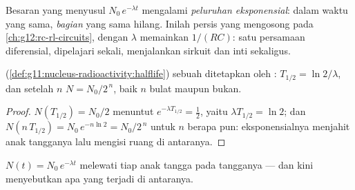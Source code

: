 \begin{definition}\label{def:g12:radioactive-decay:exponential}
Besaran yang menyusul $N_0\,e^{-\lambda t}$ mengalami \emph{peluruhan
eksponensial}: dalam waktu yang sama, \emph{bagian} yang
sama hilang. Inilah persis  yang mengosong pada
\cref{ch:g12:rc-rl-circuits}, dengan $\lambda$ memainkan $1/(RC)$: satu
persamaan diferensial, dipelajari sekali, menjalankan sirkuit dan inti sekaligus.
\end{definition}

\begin{proposition}\label{prop:g12:radioactive-decay:halflife}
 (\cref{def:g11:nucleus-radioactivity:halflife}) sebuah 
ditetapkan oleh : $T_{1/2} = \ln 2/\lambda$, dan setelah $n$
 $N = N_0/2^{\,n}$, baik $n$ bulat maupun bukan.
\end{proposition}

\begin{proof}
$N(T_{1/2}) = N_0/2$ menuntut $e^{-\lambda T_{1/2}} = \tfrac12$, yaitu
$\lambda T_{1/2} = \ln 2$; dan $N(n\,T_{1/2}) = N_0\,e^{-n\ln 2} =
N_0/2^{\,n}$ untuk $n$ berapa pun: eksponensialnya menjahit anak tangganya lalu mengisi
ruang di antaranya.
\end{proof}

\begin{omfigure}

{\small $N(t) = N_0\,e^{-\lambda t}$ melewati tiap anak tangga pada
tangganya --- dan kini menyebutkan apa yang terjadi di antaranya.}
\end{omfigure}

